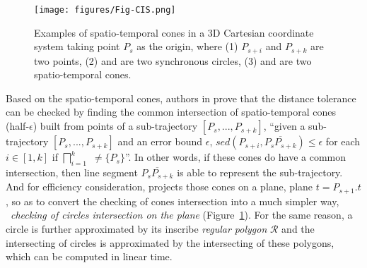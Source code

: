 




\begin{figure}[tb!]
	\centering
	\texttt{[image: figures/Fig-CIS.png]}
	\vspace{-2ex}
	\caption{\small Examples of spatio-temporal cones in a 3D Cartesian coordinate system taking point $P_s$ as the origin, where (1) $P_{s+i}$ and $P_{s+k}$ are two points, (2)  and  are two synchronous circles, (3)  and  are two spatio-temporal cones.}
	\vspace{-1ex}
	\label{fig:cis}
\end{figure}

Based on the spatio-temporal cones, authors in \cite{Lin:Cised} prove that the \sed distance tolerance can be checked by finding the common intersection of spatio-temporal cones (half-$\epsilon$) built from points of a sub-trajectory $[P_s,...,P_{s+k}]$, \ie ``{given a sub-trajectory $[P_s,...,P_{s+k}]$ and an error bound $\epsilon$, $sed(P_{s+i}, \overline{P_sP_{s+k}})\le \epsilon$ for each $i \in [1,k]$ if  $\bigsqcap_{i=1}^{k}$ $\ne \{P_s\}$}''.
In other words, if these cones do have a common intersection, then line segment $\overline{P_sP_{s+k}}$ is able to represent the sub-trajectory. And for efficiency consideration, \cised projects those cones on a plane, \eg plane $t=P_{s+1}.t$, so as to convert the checking of cones intersection into a much simpler way, \ie~\textit{checking of circles intersection on the plane} (Figure~\ref{fig:cis}).
For the same reason, a circle is further approximated by its inscribe \emph{regular polygon} $\mathcal{R}$ and the intersecting of circles is approximated by the intersecting of these polygons, which can be computed in linear time.
%

